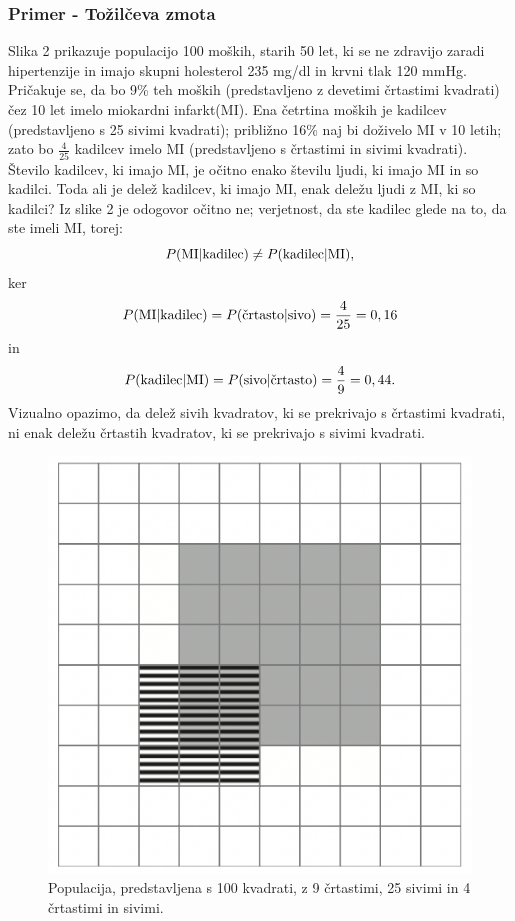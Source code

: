 \documentclass[mat1, tisk]{fmfdelo}
\theoremstyle{definition} %
\theoremstyle{trditev} %
\theoremstyle{izrek}
\begin{document}
\subsubsection{Primer - Tožilčeva zmota}
Slika 2 prikazuje populacijo 100 moških, starih 50 let, ki se ne zdravijo zaradi hipertenzije in imajo skupni holesterol 235 mg/dl in krvni tlak 120 mmHg. Pričakuje
se, da bo 9\% teh moških (predstavljeno z devetimi črtastimi kvadrati) čez 10 let imelo miokardni infarkt(MI). Ena četrtina moških je kadilcev (predstavljeno s 25
sivimi kvadrati); približno 16\% naj bi doživelo MI v 10 letih; zato bo $\frac{4}{25}$ kadilcev imelo MI (predstavljeno s črtastimi in sivimi kvadrati). \\
Število kadilcev, ki imajo MI, je očitno enako številu ljudi, ki imajo MI in so kadilci. Toda ali je delež kadilcev, ki imajo MI, enak deležu ljudi z MI, ki so kadilci? Iz
slike 2 je odogovor očitno ne; verjetnost, da ste kadilec glede na to, da ste imeli MI, torej:
\[
   P(\text{MI} \lvert \text{kadilec}) \ne P(\text{kadilec} \lvert \text{MI}), \vspace{2mm}
\]
ker
\[
   P(\text{MI} \lvert \text{kadilec}) = P(\text{črtasto} \lvert \text{sivo}) = \frac{4}{25} = 0,16 \vspace{2mm}
\]
in
\[
   P(\text{kadilec} \lvert \text{MI}) = P(\text{sivo} \lvert \text{črtasto}) = \frac{4}{9} = 0,44. \vspace{2mm}
\]
Vizualno opazimo, da delež sivih kvadratov, ki se prekrivajo s črtastimi kvadrati, ni enak deležu črtastih kvadratov, ki se prekrivajo s sivimi kvadrati.
\begin{figure}[!ht]\label{fig:slika1}
   \centering
   \includegraphics[scale=0.45]{slika1.png}
   \caption{Populacija, predstavljena s 100 kvadrati, z 9 črtastimi, 25 sivimi in 4 črtastimi in sivimi.}\vspace{2mm}
\end{figure}\\
\end{document}
